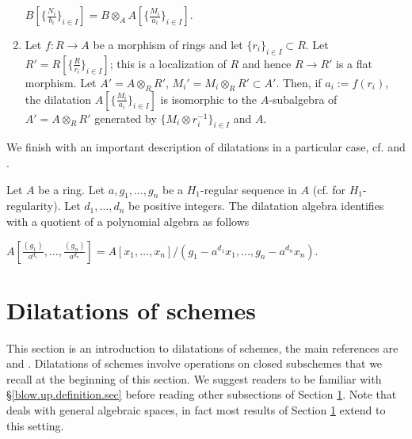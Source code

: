 \documentclass[10pt]{alggeom}
\theoremstyle{definition}
\numberwithin{equation}{section}
\begin{document}
\begin{enumerate}
\begin{center}  $B [\{ \frac{N_i}{b_i} \}_{i \in I }] = B \otimes _A A[\{\frac{M_i}{a_i}\}_{i\in I}].$\end{center}
\item Let $f:R\to A$ be a morphism of rings and let $\{r_i\}_{i\in I}\subset R$. Let $R'=R[ \big\{ \frac{R}{r_i} \big\}_{i\in I}]$; this is a localization  of $R$ and hence $R\to R'$ is a flat morphism. Let $A'=A\otimes_R R'$, $M_i'=M_i\otimes_RR'\subset A'$. Then, if $a_i:=f(r_i)$, the dilatation  $
 A[\big\{ \frac{M_i}{a_i}\big\}_{i \in I}]$ is isomorphic to the $A$-subalgebra of $A'=A \otimes _R R'$ generated by $\{M_i \otimes r_i^{-1} \}_{i\in I}$ and $A$.
\end{enumerate}
\xprop

We finish with an important description of dilatations in a particular case, cf. \cite[Proposition 5.5]{Ma23d} and  \cite[\href{https://stacks.math.columbia.edu/tag/0BIQ}{Tag 0BIQ}]{stacks-project}.


\prop \label{regupoly}Let $A$ be a ring. Let $a , g_1 , \ldots , g_n$ be a $H_1$-regular sequence in $A$ (cf. \cite[\href{https://stacks.math.columbia.edu/tag/062E}{Tag 062E}]{stacks-project} for $H_1$-regularity). Let $d_1 , \ldots , d_n$ be positive integers. The dilatation algebra identifies with a quotient of a polynomial algebra as follows 
\begin{center}
$A[\frac{(g_1)}{a^{d_1}}, \ldots , \frac{(g_n)}{a^{d_n}}]=A[x_1 , \ldots , x_n] / (g_1 -a^{d_1} x_1, \ldots , g_n -a^{d_n} x_n )$. 
\end{center}
\xprop 


\section{Dilatations of schemes}  \label{333}

This section is an introduction to dilatations of schemes, the main references are \cite{MRR20} and \cite{Ma23d}.  Dilatations of schemes involve operations on closed subschemes that we recall at the beginning of this section.  We suggest readers to be familiar with §\ref{blow.up.definition.sec} before reading other subsections of Section \ref{333}. Note that \cite{Ma23d} deals with general algebraic spaces, in fact most results of Section \ref{333} extend to this setting.
\end{document}

